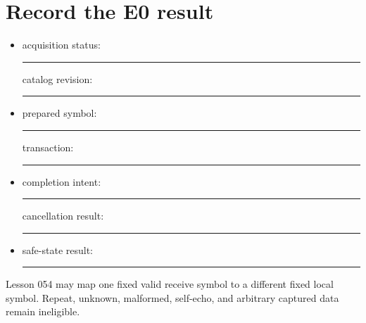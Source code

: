 \documentclass[10pt]{article}
\newcommand{\blankline}{\rule{0.78in}{0.4pt}}
\begin{document}
\section{Record the E0 result}
\begin{itemize}
 \item acquisition status: \blankline\quad catalog revision: \blankline
 \item prepared symbol: \blankline\quad transaction: \blankline
 \item completion intent: \blankline\quad cancellation result: \blankline
 \item safe-state result: \blankline
\end{itemize}

Lesson 054 may map one fixed valid receive symbol to a different fixed local
symbol. Repeat, unknown, malformed, self-echo, and arbitrary captured data
remain ineligible.
\end{document}
